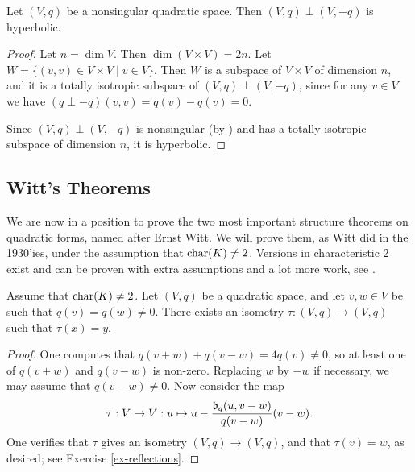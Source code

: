 \documentclass[12pt, leqno, british]{amsart}
\begin{document}
\begin{prop}\label{P:q-q-hyperbolic}
Let $(V, q)$ be a nonsingular quadratic space. Then $(V, q) \perp (V, -q)$ is hyperbolic.
\end{prop}
\begin{proof}
Let $n = \dim V$. Then $\dim (V \times V) = 2n$.
Let $W = \lbrace (v, v) \in V \times V \mid v \in V \rbrace$. Then $W$ is a subspace of $V \times V$ of dimension $n$, and it is a totally isotropic subspace of $(V, q) \perp (V, -q)$, since for any $v \in V$ we have $(q \perp -q)(v, v) = q(v) - q(v) = 0$.

Since $(V, q) \perp (V, -q)$ is nonsingular (by ) and has a totally isotropic subspace of dimension $n$, it is hyperbolic.
\end{proof}

\subsection{Witt's Theorems}
We are now in a position to prove the two most important structure theorems on quadratic forms, named after Ernst Witt.
We will prove them, as Witt did in the 1930'ies, under the assumption that $\operatorname{char}(K) \neq 2$.
Versions in characteristic 2 exist and can be proven with extra assumptions and a lot more work, see \autocite[Section 8]{ElmanKarpenkoMerkurjev}.
\begin{lem}\label{L:O(q)-transitive}
Assume that $\operatorname{char}(K) \neq 2$.
Let $(V, q)$ be a quadratic space, and let $v, w \in V$ be such that $q(v) = q(w) \neq 0$.
There exists an isometry $\tau: (V, q) \to (V, q)$ such that $\tau(x) = y$.
\end{lem}
\begin{proof}
One computes that $q(v + w) + q(v - w) = 4q(v) \neq 0$, so at least one of $q(v+w)$ and $q(v-w)$ is non-zero.
Replacing $w$ by $-w$ if necessary, we may assume that $q(v-w) \neq 0$.
Now consider the map
$$\tau : V \to V : u \mapsto u - \frac{\mathfrak{b}_q(u, v-w)}{q(v-w)}(v-w).$$
One verifies that $\tau$ gives an isometry $(V, q) \to (V, q)$, and that $\tau(v) = w$, as desired; see Exercise \eqref{ex-reflections}.
\end{proof}
\end{document}
